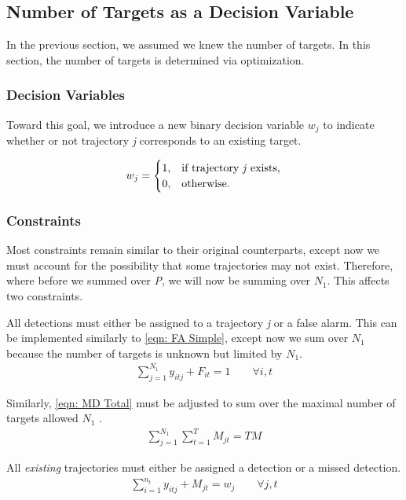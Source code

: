 \documentclass[journal]{IEEEtran}
\begin{document}
\subsection{Number of Targets as a Decision Variable}
In the previous section, we assumed we knew the number of targets. In this section, the number of targets is determined via optimization. 

\subsubsection{Decision Variables}
Toward this goal, we introduce a new binary decision variable $w_{j}$ to indicate whether or not trajectory \textit{j} corresponds to an existing target.

\[w_{j} = 
\begin{cases}
1, & \text{if trajectory \textit{j} exists,}\\
0, & \text{otherwise.}
\end{cases}\]

\subsubsection{Constraints}
Most constraints remain similar to their original counterparts, except now we must account for the possibility that some trajectories may not exist. Therefore, where before we summed over \textit{P}, we will now be summing over $N_{1}$. This affects two constraints.

All detections must either be assigned to a trajectory \textit{j} or a false alarm. This can be implemented similarly to \eqref{eqn: FA Simple}, except now we sum over $N_{1}$ because the number of targets is unknown but limited by $N_{1}$.
\begin{align}
\sum_{j=1}^{N_{1}} y_{itj} + F_{it} = 1 \qquad \forall i,t
\end{align}

Similarly, \eqref{eqn: MD Total} must be adjusted to sum over the maximal number of targets allowed $N_{1}$ . 
\begin{align}
\sum_{j=1}^{N_{1}} \sum_{t=1}^{T} M_{jt} = TM
\end{align}

All \textit{existing} trajectories must either be assigned a detection or a missed detection. 
\begin{align}\label{eqn: Existing Targets}
\sum_{i=1}^{n_{t}} y_{itj} + M_{jt} = w_{j} \qquad \forall j,t
\end{align}
\end{document}
